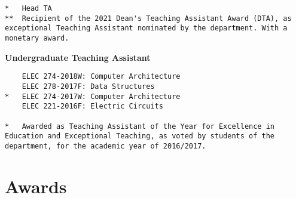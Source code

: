 \documentclass[margin]{res}
\begin{document}
\begin{resume}
\begin{lstlisting}
*   Head TA
**  Recipient of the 2021 Dean's Teaching Assistant Award (DTA), as exceptional Teaching Assistant nominated by the department. With a monetary award.
\end{lstlisting}

\textbf{Undergraduate Teaching Assistant}

\begin{lstlisting}
    ELEC 274-2018W: Computer Architecture
    ELEC 278-2017F: Data Structures
*   ELEC 274-2017W: Computer Architecture
    ELEC 221-2016F: Electric Circuits

*   Awarded as Teaching Assistant of the Year for Excellence in Education and Exceptional Teaching, as voted by students of the department, for the academic year of 2016/2017.
\end{lstlisting}


\section{Awards}



\end{resume}
\end{document}

